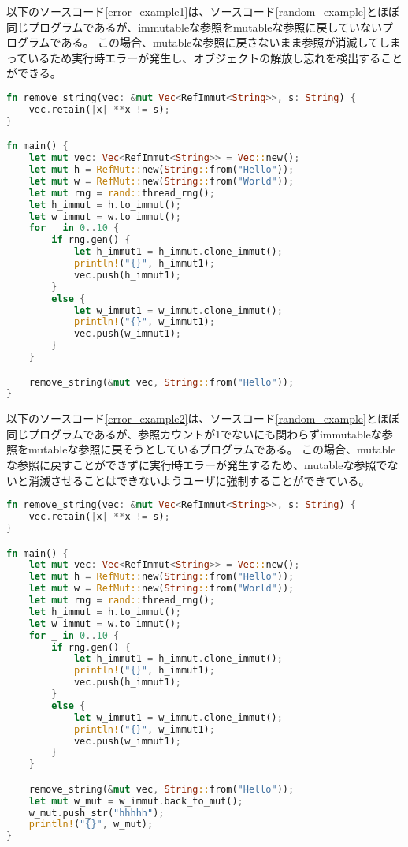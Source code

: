 \documentclass{sumiilab-paper}
\theoremstyle{mystyle}
\numberwithin{definition}{chapter} %
\begin{document}
以下のソースコード\ref{error_example1}は、ソースコード\ref{random_example}とほぼ同じプログラムであるが、immutableな参照をmutableな参照に戻していないプログラムである。
この場合、mutableな参照に戻さないまま参照が消滅してしまっているため実行時エラーが発生し、オブジェクトの解放し忘れを検出することができる。
\begin{lstlisting}[language=Rust, caption=オブジェクトの解放し忘れを検出する例, label=error_example1, captionpos=b]
fn remove_string(vec: &mut Vec<RefImmut<String>>, s: String) {
    vec.retain(|x| **x != s);
}

fn main() {
    let mut vec: Vec<RefImmut<String>> = Vec::new();
    let mut h = RefMut::new(String::from("Hello"));
    let mut w = RefMut::new(String::from("World"));
    let mut rng = rand::thread_rng();
    let h_immut = h.to_immut();
    let w_immut = w.to_immut();
    for _ in 0..10 {
        if rng.gen() {
            let h_immut1 = h_immut.clone_immut();
            println!("{}", h_immut1);
            vec.push(h_immut1);
        }
        else {
            let w_immut1 = w_immut.clone_immut();
            println!("{}", w_immut1);
            vec.push(w_immut1);
        }
    }

    remove_string(&mut vec, String::from("Hello"));
}
\end{lstlisting}

以下のソースコード\ref{error_example2}は、ソースコード\ref{random_example}とほぼ同じプログラムであるが、参照カウントが1でないにも関わらずimmutableな参照をmutableな参照に戻そうとしているプログラムである。
この場合、mutableな参照に戻すことができずに実行時エラーが発生するため、mutableな参照でないと消滅させることはできないようユーザに強制することができている。
\begin{lstlisting}[language=Rust, caption=mutableな参照へ戻せないことを検出する例, label=error_example2, captionpos=b]
fn remove_string(vec: &mut Vec<RefImmut<String>>, s: String) {
    vec.retain(|x| **x != s);
}

fn main() {
    let mut vec: Vec<RefImmut<String>> = Vec::new();
    let mut h = RefMut::new(String::from("Hello"));
    let mut w = RefMut::new(String::from("World"));
    let mut rng = rand::thread_rng();
    let h_immut = h.to_immut();
    let w_immut = w.to_immut();
    for _ in 0..10 {
        if rng.gen() {
            let h_immut1 = h_immut.clone_immut();
            println!("{}", h_immut1);
            vec.push(h_immut1);
        }
        else {
            let w_immut1 = w_immut.clone_immut();
            println!("{}", w_immut1);
            vec.push(w_immut1);
        }
    }

    remove_string(&mut vec, String::from("Hello"));
    let mut w_mut = w_immut.back_to_mut();
    w_mut.push_str("hhhhh");
    println!("{}", w_mut);
}
\end{lstlisting}
\end{document}
